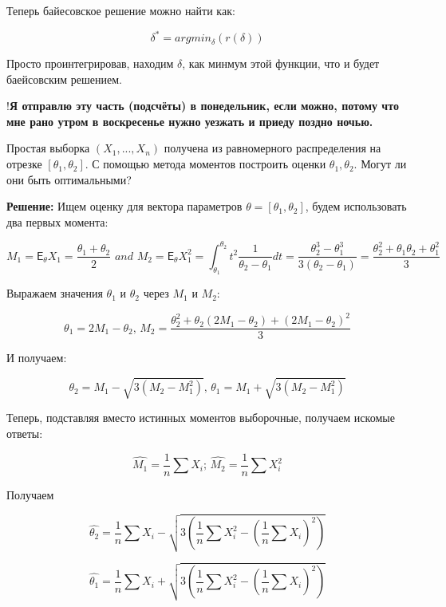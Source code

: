 \documentclass[12pt]{article}
\theoremstyle{definiton}
\theoremstyle{definition}
\theoremstyle{definition}
\newcommand{\Expect}{\mathsf{E}}
\newcounter{problem}
\newcounter{subproblem}
\def\prp{\medskip\noindent\stepcounter{problem}{\bf Задача \theproblem .  }\setcounter{subproblem}{0} }
\begin{document}
Теперь байесовское решение можно найти как:


$$\delta^* = argmin_{\delta} (r(\delta))$$

Просто проинтегрировав, находим $\delta$, как минмум этой функции, что и будет баейсовским решением.

!\textbf{Я отправлю эту часть (подсчёты) в понедельник, если можно, потому что мне рано утром в воскресенье нужно уезжать и приеду поздно ночью.}



















\prp Простая выборка $(X_1, . . . , X_n)$ получена из равномерного распределения на отрезке $[\theta_1, \theta_2]$. С помощью метода моментов построить оценки $\theta_1,\theta_2$. Могут ли они быть оптимальными?

\textbf{Решение: } Ищем оценку для вектора параметров $\theta = [\theta_1, \theta_2]$, будем использовать два первых момента:

$$M_1 = \Expect_\theta X_1 = \frac{\theta_1 + \theta_2}{2} \, \, and  \, \, M_2 = \Expect_\theta X_1^2 = \int_{\theta_1}^{\theta_2}t^2\frac{1}{\theta_2 - \theta_1} dt = \frac{\theta_2^3 - \theta_1^3}{3(\theta_2 - \theta_1)} = \frac{\theta_2^2 + \theta_1 \theta_2 + \theta_1^2}{3}$$

Выражаем значения $\theta_1$ и $\theta_2$ через $M_1$ и $M_2$:

$$\theta_1 = 2M_1 - \theta_2, \, M_2 = \frac{\theta_2^2 + \theta_2 (2M_1 - \theta_2) + (2M_1 - \theta_2)^2}{3}$$

И получаем:

$$\theta_2 = M_1 - \sqrt{3(M_2 - M_1^2)}, \, \theta_1 = M_1 + \sqrt{3(M_2 - M_1^2)}$$

Теперь, подставляя вместо истинных моментов выборочные, получаем искомые ответы:

$$\hat{M_1} = \frac{1}{n}\sum X_i; \, \hat{M_2} = \frac{1}{n}\sum X_i^2$$

Получаем

$$\hat{\theta_2} = \frac{1}{n}\sum X_i - \sqrt{3(\frac{1}{n}\sum X_i^2 - (\frac{1}{n}\sum X_i)^2)}$$ 

$$\hat{\theta_1} = \frac{1}{n}\sum X_i + \sqrt{3(\frac{1}{n}\sum X_i^2 - (\frac{1}{n}\sum X_i)^2)}$$
\end{document}
